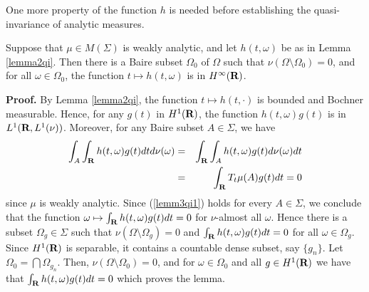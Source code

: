 \bigskip
One more property of the function $h$ is needed before 
establishing the quasi-invariance of analytic measures.
\begin{lemma3qi}
Suppose that $\mu\in M(\Sigma)$ 
is weakly analytic, and let $h(t,\omega)$ 
be as in Lemma \ref{lemma2qi}.  Then there is 
a Baire subset $\Omega_0$ of $\Omega$ such 
that $\nu (\Omega\setminus\Omega_0)=0$, and 
for all $\omega\in \Omega_0$, the 
function $t\mapsto h(t,\omega)$ is in $H^\infty(\R)$. 
\label{lemma3qi}
\end{lemma3qi}
{\bf Proof.} By
Lemma \ref{lemma2qi}, the function $t\mapsto h(t,\cdot)$
is bounded and Bochner measurable.  Hence, for any $g(t)$ in $H^1(\R)$, the  
function $h(t,\omega) g(t)$ is in $L^1(\R,L^1(\nu))$.  
Moreover, for any Baire subset $A\in \Sigma$, we have
\begin{eqnarray}
\int_A \int_\R h(t,\omega) g(t) dt d\nu(\omega) &=&
		\int_\R \int_A h(t,\omega) g(t) d\nu(\omega)dt \nonumber\\
		&=& 
		\int_\R T_t\mu(A) g(t) dt=0
\label{lemm3qi1}
\end{eqnarray}
since $\mu$ is weakly analytic.  Since (\ref{lemm3qi1}) holds 
for every $A\in \Sigma$, we conclude that the function 
$\omega \mapsto \int_\R h(t,\omega)g(t)dt=0$ for $\nu$-almost 
all $\omega$.  Hence there is a subset $\Omega_g\in \Sigma$ 
such that $\nu (\Omega\setminus\Omega_g)=0$ 
and $\int_\R h(t,\omega)g(t)dt=0$ for all 
$\omega\in \Omega_g$.  Since $H^1(\R)$ is 
separable, it contains a countable dense 
subset, say $\{g_n\}$.  Let 
$ \Omega_0=\bigcap \Omega_{g_n}$.  
Then, $\nu(\Omega\setminus\Omega_0)=0$, 
and for $\omega\in \Omega_0$ and all 
$g\in H^1(\R)$ we have that $\int_\R h(t,\omega)g(t)dt=0$ 
which proves the lemma.

\bigskip

